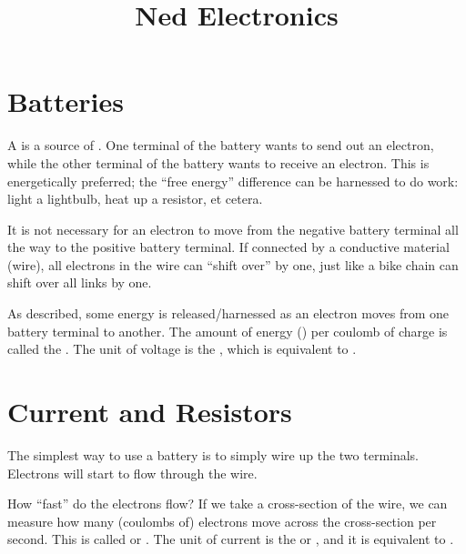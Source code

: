 \documentclass[11pt, oneside]{amsart}
\begin{document}
\title{Ned Electronics}
\maketitle

\section{Batteries}

A  is a source of . One terminal of the
battery wants to send out an electron, while the other terminal of the
battery wants to receive an electron. This is energetically preferred;
the ``free energy'' difference can be harnessed to do work: light a
lightbulb, heat up a resistor, et cetera.


It is not necessary for an electron to move from the negative battery
terminal all the way to the positive battery terminal. If connected by a
conductive material (wire), all electrons in the wire can ``shift over''
by one, just like a bike chain can shift over all links by one.


As described, some energy is released/harnessed as an electron moves
from one battery terminal to another. The amount of energy
() per coulomb of charge is called the .
The unit of voltage is the , which is equivalent to
.

\section{Current and Resistors}

The simplest way to use a battery is to simply wire up the two
terminals. Electrons will start to flow through the wire.

How ``fast'' do the electrons flow? If we take a cross-section of the
wire, we can measure how many (coulombs of) electrons move across the
cross-section per second. This is called  or
. The unit of current is the  or
, and it is equivalent to .
\end{document}
